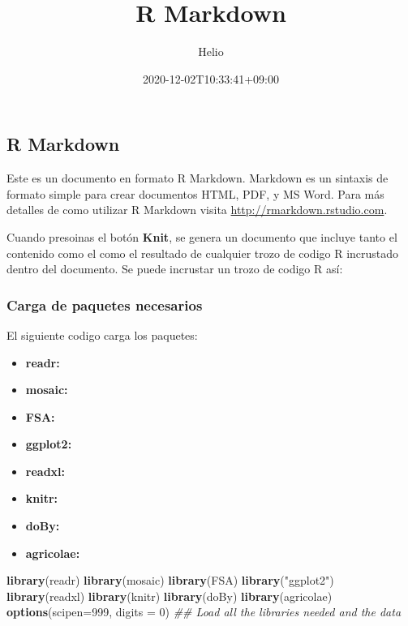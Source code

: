 \documentclass[]{article}
\title{R Markdown}
\author{Helio}
\date{2020-12-02T10:33:41+09:00}
\newenvironment{Shaded}{\begin{snugshade}}{\end{snugshade}}
\newcommand{\CommentTok}[1]{\textcolor[rgb]{0.56,0.35,0.01}{\textit{#1}}}
\newcommand{\DataTypeTok}[1]{\textcolor[rgb]{0.13,0.29,0.53}{#1}}
\newcommand{\DecValTok}[1]{\textcolor[rgb]{0.00,0.00,0.81}{#1}}
\newcommand{\KeywordTok}[1]{\textcolor[rgb]{0.13,0.29,0.53}{\textbf{#1}}}
\newcommand{\NormalTok}[1]{#1}
\newcommand{\StringTok}[1]{\textcolor[rgb]{0.31,0.60,0.02}{#1}}
\providecommand{\tightlist}{%
  \setlength{\itemsep}{0pt}\setlength{\parskip}{0pt}}
\begin{document}
\maketitle

\hypertarget{r-markdown}{%
\subsection{R Markdown}\label{r-markdown}}

Este es un documento en formato R Markdown. Markdown es un sintaxis de
formato simple para crear documentos HTML, PDF, y MS Word. Para más
detalles de como utilizar R Markdown visita
\url{http://rmarkdown.rstudio.com}.

Cuando presoinas el botón \textbf{Knit}, se genera un documento que
incluye tanto el contenido como el como el resultado de cualquier trozo
de codigo R incrustado dentro del documento. Se puede incrustar un trozo
de codigo R así:

\hypertarget{carga-de-paquetes-necesarios}{%
\subsubsection{Carga de paquetes
necesarios}\label{carga-de-paquetes-necesarios}}

El siguiente codigo carga los paquetes:

\begin{itemize}
\tightlist
\item
  \textbf{readr:}
\item
  \textbf{mosaic:}
\item
  \textbf{FSA:}
\item
  \textbf{ggplot2:}
\item
  \textbf{readxl:}
\item
  \textbf{knitr:}
\item
  \textbf{doBy:}
\item
  \textbf{agricolae:}
\end{itemize}

\begin{Shaded}
\begin{Highlighting}[]
\KeywordTok{library}\NormalTok{(readr)}
\KeywordTok{library}\NormalTok{(mosaic)}
\KeywordTok{library}\NormalTok{(FSA)}
\KeywordTok{library}\NormalTok{(}\StringTok{"ggplot2"}\NormalTok{)}
\KeywordTok{library}\NormalTok{(readxl)}
\KeywordTok{library}\NormalTok{(knitr)}
\KeywordTok{library}\NormalTok{(doBy)}
\KeywordTok{library}\NormalTok{(agricolae)}
\KeywordTok{options}\NormalTok{(}\DataTypeTok{scipen=}\DecValTok{999}\NormalTok{, }\DataTypeTok{digits =} \DecValTok{0}\NormalTok{)}
\CommentTok{## Load all the libraries needed and the data}
\end{Highlighting}
\end{Shaded}
\end{document}
